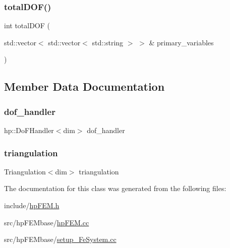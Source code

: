 \mbox{\label{classhp_f_e_m_a9ceee3881af75e3be863fdb2d1688c0e}} 
\subsubsection{\texorpdfstring{totalDOF()}{totalDOF()}}
{\footnotesize\ttfamily int total\+D\+OF (\begin{DoxyParamCaption}\item[{std\+::vector$<$ std\+::vector$<$ std\+::string $>$ $>$ \&}]{primary\+\_\+variables }\end{DoxyParamCaption})}



\subsection{Member Data Documentation}
\mbox{\label{classhp_f_e_m_ab4df20fb431f370878adc06e19280d62}} 
\subsubsection{\texorpdfstring{dof\_handler}{dof\_handler}}
{\footnotesize\ttfamily hp\+::\+Do\+F\+Handler$<$dim$>$ dof\+\_\+handler}

\mbox{\label{classhp_f_e_m_a1e604d1e68926caf1ebc67d2a7451783}} 
\subsubsection{\texorpdfstring{triangulation}{triangulation}}
{\footnotesize\ttfamily Triangulation$<$dim$>$ triangulation}



The documentation for this class was generated from the following files\+:\begin{DoxyCompactItemize}
\item 
include/\mbox{\hyperlink{hp_f_e_m_8h}{hp\+F\+E\+M.\+h}}\item 
src/hp\+F\+E\+Mbase/\mbox{\hyperlink{hp_f_e_m_8cc}{hp\+F\+E\+M.\+cc}}\item 
src/hp\+F\+E\+Mbase/\mbox{\hyperlink{setup___fe_system_8cc}{setup\+\_\+\+Fe\+System.\+cc}}\end{DoxyCompactItemize}
